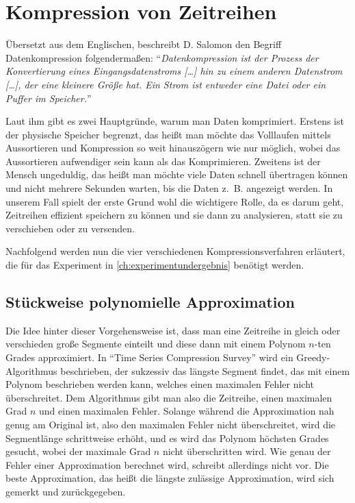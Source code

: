 \section{Kompression von Zeitreihen}
Übersetzt aus dem Englischen, beschreibt D. Salomon den Begriff Datenkompression \cite[p. 1-2]{dataCompressionSalmon} folgendermaßen: "`\textit{Datenkompression ist der Prozess der Konvertierung eines Eingangsdatenstroms [\ldots] hin zu einem anderen Datenstrom [\ldots], der eine kleinere Größe hat. Ein Strom ist entweder eine Datei oder ein Puffer im Speicher.}"'

Laut ihm gibt es zwei Hauptgründe, warum man Daten komprimiert. Erstens ist der physische Speicher begrenzt, das heißt man möchte das Volllaufen mittels Aussortieren und Kompression so weit hinauszögern wie nur möglich, wobei das Aussortieren aufwendiger sein kann als das Komprimieren. Zweitens ist der Mensch ungeduldig, das heißt man möchte viele Daten schnell übertragen können und nicht mehrere Sekunden warten, bis die Daten z.~B. angezeigt werden. In unserem Fall spielt der erste Grund wohl die wichtigere Rolle, da es darum geht, Zeitreihen effizient speichern zu können und sie dann zu analysieren, statt sie zu verschieben oder zu versenden.

Nachfolgend werden nun die vier verschiedenen Kompressionsverfahren erläutert, die für das Experiment in \autoref{ch:experimentundergebnis} benötigt werden.

\subsection{Stückweise polynomielle Approximation}\label{subsec:ppa}
Die Idee hinter dieser Vorgehensweise ist, dass man eine Zeitreihe in gleich oder verschieden große Segmente einteilt und diese dann mit einem Polynom $n$-ten Grades approximiert. In "`Time Series Compression Survey"' \cite[Ch. 4.2.1]{compressionSurvey} wird ein Greedy-Algorithmus beschrieben, der sukzessiv das längste Segment findet, das mit einem Polynom beschrieben werden kann, welches einen maximalen Fehler nicht überschreitet. Dem Algorithmus gibt man also die Zeitreihe, einen maximalen Grad $n$ und einen maximalen Fehler. Solange während die Approximation nah genug am Original ist, also den maximalen Fehler nicht überschreitet, wird die Segmentlänge schrittweise erhöht, und es wird das Polynom höchsten Grades gesucht, wobei der maximale Grad $n$ nicht überschritten wird. Wie genau der Fehler einer Approximation berechnet wird, schreibt \cite[Algorithm 4]{compressionSurvey} allerdings nicht vor. Die beste Approximation, das heißt die längste zulässige Approximation, wird sich gemerkt und zurückgegeben.

